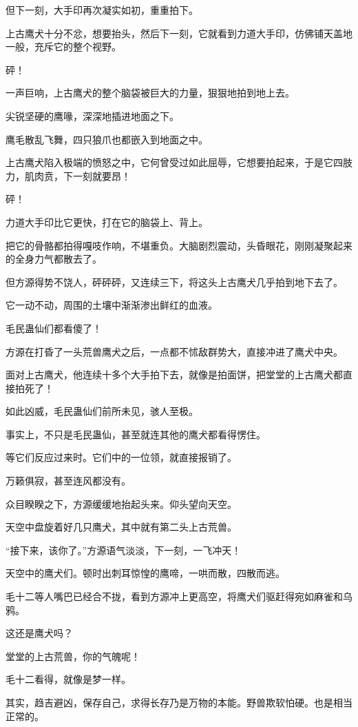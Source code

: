 \begin{this_body}
但下一刻，大手印再次凝实如初，重重拍下。

上古鹰犬十分不忿，想要抬头，然后下一刻，它就看到力道大手印，仿佛铺天盖地一般，充斥它的整个视野。

砰！

一声巨响，上古鹰犬的整个脑袋被巨大的力量，狠狠地拍到地上去。

尖锐坚硬的鹰喙，深深地插进地面之下。

鹰毛散乱飞舞，四只狼爪也都嵌入到地面之中。

上古鹰犬陷入极端的愤怒之中，它何曾受过如此屈辱，它想要拍起来，于是它四肢力，肌肉贲，下一刻就要昂！

砰！

力道大手印比它更快，打在它的脑袋上、背上。

把它的骨骼都拍得嘎吱作响，不堪重负。大脑剧烈震动，头昏眼花，刚刚凝聚起来的全身力气都散去了。

但方源得势不饶人，砰砰砰，又连续三下，将这头上古鹰犬几乎拍到地下去了。

它一动不动，周围的土壤中渐渐渗出鲜红的血液。

毛民蛊仙们都看傻了！

方源在打昏了一头荒兽鹰犬之后，一点都不怵敌群势大，直接冲进了鹰犬中央。

面对上古鹰犬，他连续十多个大手拍下去，就像是拍面饼，把堂堂的上古鹰犬都直接拍死了！

如此凶威，毛民蛊仙们前所未见，骇人至极。

事实上，不只是毛民蛊仙，甚至就连其他的鹰犬都看得愣住。

等它们反应过来时。它们中的一位领，就直接报销了。

万籁俱寂，甚至连风都没有。

众目睽睽之下，方源缓缓地抬起头来。仰头望向天空。

天空中盘旋着好几只鹰犬，其中就有第二头上古荒兽。

“接下来，该你了。”方源语气淡淡，下一刻，一飞冲天！

天空中的鹰犬们。顿时出刺耳惊惶的鹰啼，一哄而散，四散而逃。

毛十二等人嘴巴已经合不拢，看到方源冲上更高空，将鹰犬们驱赶得宛如麻雀和乌鸦。

这还是鹰犬吗？

堂堂的上古荒兽，你的气魄呢！

毛十二看得，就像是梦一样。

其实，趋吉避凶，保存自己，求得长存乃是万物的本能。野兽欺软怕硬。也是相当正常的。


\end{this_body}
